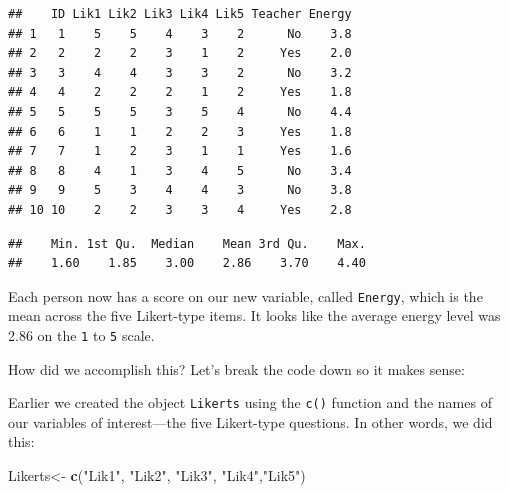 \documentclass[
]{book}
\newenvironment{Shaded}{\begin{snugshade}}{\end{snugshade}}
\newcommand{\CommentTok}[1]{\textcolor[rgb]{0.56,0.35,0.01}{\textit{#1}}}
\newcommand{\DataTypeTok}[1]{\textcolor[rgb]{0.13,0.29,0.53}{#1}}
\newcommand{\DecValTok}[1]{\textcolor[rgb]{0.00,0.00,0.81}{#1}}
\newcommand{\KeywordTok}[1]{\textcolor[rgb]{0.13,0.29,0.53}{\textbf{#1}}}
\newcommand{\NormalTok}[1]{#1}
\newcommand{\OperatorTok}[1]{\textcolor[rgb]{0.81,0.36,0.00}{\textbf{#1}}}
\newcommand{\StringTok}[1]{\textcolor[rgb]{0.31,0.60,0.02}{#1}}
\begin{document}
\begin{Shaded}
\end{Shaded}

\begin{verbatim}
##    ID Lik1 Lik2 Lik3 Lik4 Lik5 Teacher Energy
## 1   1    5    5    4    3    2      No    3.8
## 2   2    2    2    3    1    2     Yes    2.0
## 3   3    4    4    3    3    2      No    3.2
## 4   4    2    2    2    1    2     Yes    1.8
## 5   5    5    5    3    5    4      No    4.4
## 6   6    1    1    2    2    3     Yes    1.8
## 7   7    1    2    3    1    1     Yes    1.6
## 8   8    4    1    3    4    5      No    3.4
## 9   9    5    3    4    4    3      No    3.8
## 10 10    2    2    3    3    4     Yes    2.8
\end{verbatim}

\begin{Shaded}
\end{Shaded}

\begin{verbatim}
##    Min. 1st Qu.  Median    Mean 3rd Qu.    Max. 
##    1.60    1.85    3.00    2.86    3.70    4.40
\end{verbatim}

Each person now has a score on our new variable, called \texttt{Energy}, which is the mean across the five Likert-type items. It looks like the average energy level was 2.86 on the \texttt{1} to \texttt{5} scale.

How did we accomplish this? Let's break the code down so it makes sense:

Earlier we created the object \texttt{Likerts} using the \texttt{c()} function and the names of our variables of interest---the five Likert-type questions. In other words, we did this:

\begin{Shaded}
\begin{Highlighting}[]
\NormalTok{Likerts<-}\StringTok{ }\KeywordTok{c}\NormalTok{(}\StringTok{"Lik1"}\NormalTok{, }\StringTok{"Lik2"}\NormalTok{, }\StringTok{"Lik3"}\NormalTok{, }\StringTok{"Lik4"}\NormalTok{,}\StringTok{"Lik5"}\NormalTok{)}
\end{Highlighting}
\end{Shaded}
\end{document}
